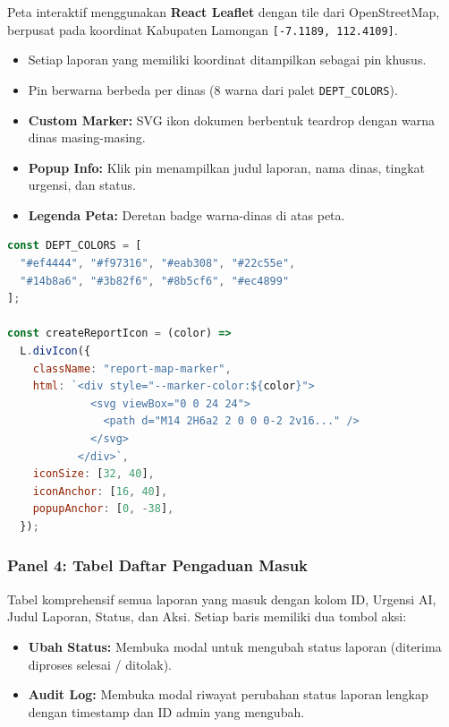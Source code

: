\documentclass[12pt,a4paper]{article}
\begin{document}
Peta interaktif menggunakan \textbf{React Leaflet} dengan tile dari OpenStreetMap,
berpusat pada koordinat Kabupaten Lamongan \texttt{[-7.1189, 112.4109]}.

\begin{itemize}[leftmargin=2em, itemsep=4pt]
  \item Setiap laporan yang memiliki koordinat ditampilkan sebagai pin khusus.
  \item Pin berwarna berbeda per dinas (8 warna dari palet \texttt{DEPT\_COLORS}).
  \item \textbf{Custom Marker:} SVG ikon dokumen berbentuk teardrop dengan warna
        dinas masing-masing.
  \item \textbf{Popup Info:} Klik pin menampilkan judul laporan, nama dinas,
        tingkat urgensi, dan status.
  \item \textbf{Legenda Peta:} Deretan badge warna-dinas di atas peta.
\end{itemize}

\begin{lstlisting}[language=JavaScript, caption=Custom Leaflet marker per dinas]
const DEPT_COLORS = [
  "#ef4444", "#f97316", "#eab308", "#22c55e",
  "#14b8a6", "#3b82f6", "#8b5cf6", "#ec4899"
];

const createReportIcon = (color) =>
  L.divIcon({
    className: "report-map-marker",
    html: `<div style="--marker-color:${color}">
             <svg viewBox="0 0 24 24">
               <path d="M14 2H6a2 2 0 0 0-2 2v16..." />
             </svg>
           </div>`,
    iconSize: [32, 40],
    iconAnchor: [16, 40],
    popupAnchor: [0, -38],
  });
\end{lstlisting}

\subsubsection{Panel 4: Tabel Daftar Pengaduan Masuk}

Tabel komprehensif semua laporan yang masuk dengan kolom ID, Urgensi AI,
Judul Laporan, Status, dan Aksi. Setiap baris memiliki dua tombol aksi:

\begin{itemize}[leftmargin=2em, itemsep=4pt]
  \item \textbf{Ubah Status:} Membuka modal untuk mengubah status laporan
        (diterima \textrightarrow{} diproses \textrightarrow{} selesai / ditolak).
  \item \textbf{Audit Log:} Membuka modal riwayat perubahan status laporan
        lengkap dengan timestamp dan ID admin yang mengubah.
\end{itemize}
\end{document}
